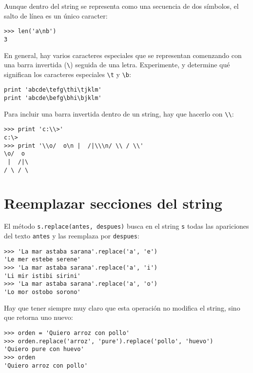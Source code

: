 Aunque dentro del string se representa como una secuencia de dos
símbolos, el salto de línea es un único caracter:

\begin{lstlisting}
>>> len('a\nb')
3
\end{lstlisting}

En general, hay varios caracteres especiales que se representan
comenzando con una barra invertida (\lstinline!\!) seguida de una letra.
Experimente, y determine qué significan los caracteres especiales
\lstinline!\t! y \lstinline!\b!:

\begin{lstlisting}
print 'abcde\tefg\thi\tjklm'
print 'abcde\befg\bhi\bjklm'
\end{lstlisting}

Para incluir una barra invertida dentro de un string, hay que hacerlo
con \lstinline!\\!:

\begin{lstlisting}
>>> print 'c:\\>'
c:\>
>>> print '\\o/  o\n |  /|\\\n/ \\ / \\'
\o/  o
 |  /|\
/ \ / \
\end{lstlisting}

\section{Reemplazar secciones del string}

El método \lstinline!s.replace(antes, despues)! busca en el string
\lstinline!s! todas las apariciones del texto \lstinline!antes! y las
reemplaza por \lstinline!despues!:

\begin{lstlisting}
>>> 'La mar astaba sarana'.replace('a', 'e')
'Le mer estebe serene'
>>> 'La mar astaba sarana'.replace('a', 'i')
'Li mir istibi sirini'
>>> 'La mar astaba sarana'.replace('a', 'o')
'Lo mor ostobo sorono'
\end{lstlisting}

Hay que tener siempre muy claro que esta operación no modifica el
string, sino que retorna uno nuevo:

\begin{lstlisting}
>>> orden = 'Quiero arroz con pollo'
>>> orden.replace('arroz', 'pure').replace('pollo', 'huevo')
'Quiero pure con huevo'
>>> orden
'Quiero arroz con pollo'
\end{lstlisting}

